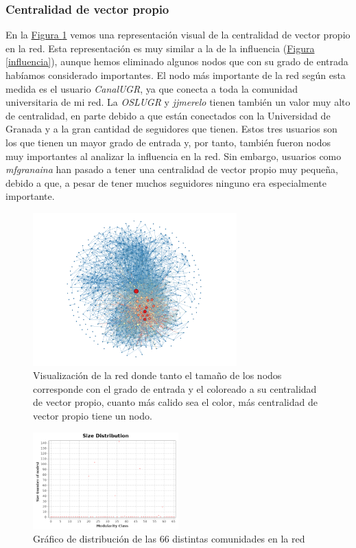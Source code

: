 \documentclass[10pt,a4paper,spanish]{article}
\numberwithin{equation}{section} %
\numberwithin{figure}{section} %
\numberwithin{table}{section} %
\begin{document}
\subsubsection{Centralidad de vector propio}
En la \hyperref[evv]{Figura \ref*{evv}} vemos una representación visual de la centralidad de vector propio en la red. Esta representación es muy similar a la de la influencia (\hyperref[influencia]{Figura \ref*{influencia}}), aunque hemos eliminado algunos nodos que con su grado de entrada habíamos considerado importantes. El nodo más importante de la red según esta medida es el usuario \textit{CanalUGR}, ya que conecta a toda la comunidad universitaria de mi red. La \textit{OSLUGR} y \textit{jjmerelo} tienen también un valor muy alto de centralidad, en parte debido a que están conectados con la Universidad de Granada y a la gran cantidad de seguidores que tienen. Estos tres usuarios son los que tienen un mayor grado de entrada y, por tanto, también fueron nodos muy importantes al analizar la influencia en la red. Sin embargo, usuarios como \textit{mfgranaina} han pasado a tener una centralidad de vector propio muy pequeña, debido a que, a pesar de tener muchos seguidores ninguno era especialmente importante.

\begin{figure}[!h]
    \centering
    \includegraphics[width=0.7\textwidth]{medidas_locales/eigenvector}
    \caption{Visualización de la red donde tanto el tamaño de los nodos corresponde con el grado de entrada y el coloreado a su centralidad de vector propio, cuanto más calido sea el color, más centralidad de vector propio tiene un nodo.}
    \label{evv}
\end{figure}


\begin{figure}[!h]
    \centering
    \includegraphics[width=0.5\textwidth]{modularity-report/communities-size-distribution}
    \caption{Gráfico de distribución de las 66 distintas comunidades en la red}
    \label{com}
\end{figure}
\end{document}
